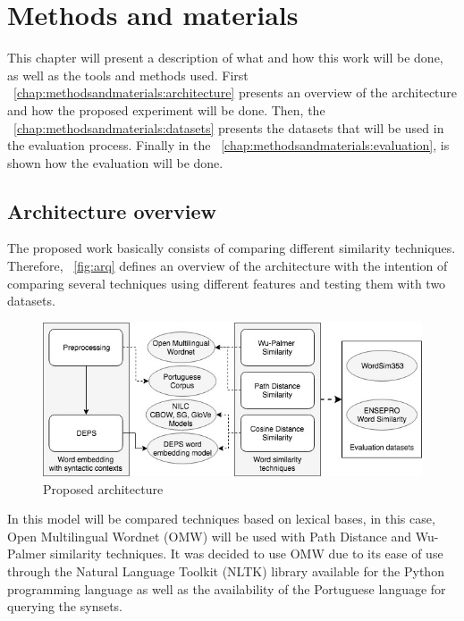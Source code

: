 \section{Methods and materials}\label{chap:methodsandmaterials}

This chapter will present a description of what and how this work will be done, as well as the tools and methods used. First ~\autoref{chap:methodsandmaterials:architecture} presents an overview of the architecture and how the proposed experiment will be done. Then, the ~\autoref{chap:methodsandmaterials:datasets} presents the datasets that will be used in the evaluation process. Finally in the ~\autoref{chap:methodsandmaterials:evaluation}, is shown how the evaluation will be done.

\subsection{Architecture overview}\label{chap:methodsandmaterials:architecture}

The proposed work basically consists of comparing different similarity techniques. Therefore, ~\autoref{fig:arq} defines an overview of the architecture with the intention of comparing several techniques using different features and testing them with two datasets.

\begin{figure}[h]
	\caption{Proposed architecture}
	\label{fig:arq}
	\centering%
	\begin{minipage}{.8\textwidth}
		\includegraphics[width=\textwidth]{arq.jpg}
	\end{minipage}
\end{figure}

In this model will be compared techniques based on lexical bases, in this case, Open Multilingual Wordnet (OMW) will be used with Path Distance and Wu-Palmer similarity techniques. It was decided to use OMW due to its ease of use through the Natural Language Toolkit (NLTK) library available for the Python programming language as well as the availability of the Portuguese language for querying the synsets.

